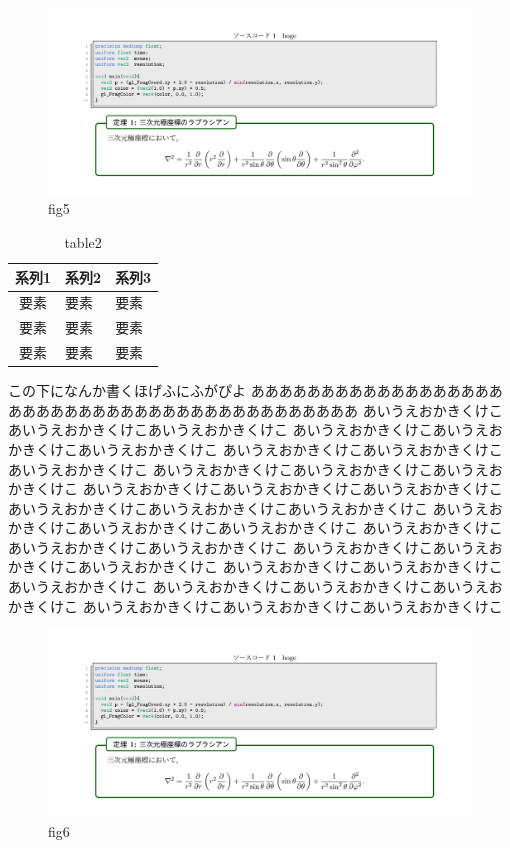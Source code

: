 \documentclass[uplatex,dvipdfmx,ja=standard,a4paper]{bxjsarticle}
\begin{document}
\begin{figure}[h]
\begin{minipage}[t]{0.24\columnwidth}
    \centering
    \includegraphics[keepaspectratio, width=\columnwidth,clip]{hoge.png}
    \caption{fig5}
    \label{fig:5}
  \end{minipage}
\end{figure}

\begin{table}
  \vspace*{-\intextsep}
  \caption{table2}
  \label{table:2}
  \begin{tabular}{cll}
    \hline
    系列1 & 系列2 & 系列3 \\
    \hline
    要素 & 要素 & 要素 \\[-4pt]
    要素 & 要素 & 要素 \\[-4pt]
    要素 & 要素 & 要素 \\
    \hline
  \end{tabular}
\end{table}
この下になんか書くほげふにふがぴよ
ああああああああああああああああああ
あああああああああああああああああああああああああ
あいうえおかきくけこあいうえおかきくけこあいうえおかきくけこ
あいうえおかきくけこあいうえおかきくけこあいうえおかきくけこ
あいうえおかきくけこあいうえおかきくけこあいうえおかきくけこ
あいうえおかきくけこあいうえおかきくけこあいうえおかきくけこ
あいうえおかきくけこあいうえおかきくけこあいうえおかきくけこ
あいうえおかきくけこあいうえおかきくけこあいうえおかきくけこ
あいうえおかきくけこあいうえおかきくけこあいうえおかきくけこ
あいうえおかきくけこあいうえおかきくけこあいうえおかきくけこ
あいうえおかきくけこあいうえおかきくけこあいうえおかきくけこ
あいうえおかきくけこあいうえおかきくけこあいうえおかきくけこ
あいうえおかきくけこあいうえおかきくけこあいうえおかきくけこ
あいうえおかきくけこあいうえおかきくけこあいうえおかきくけこ

\begin{figure}
  \vspace*{-\intextsep}
  \includegraphics[keepaspectratio, width=10zw,clip]{hoge.png}
  \caption{fig6}
  \label{fig:6}
\end{figure}
\end{document}
